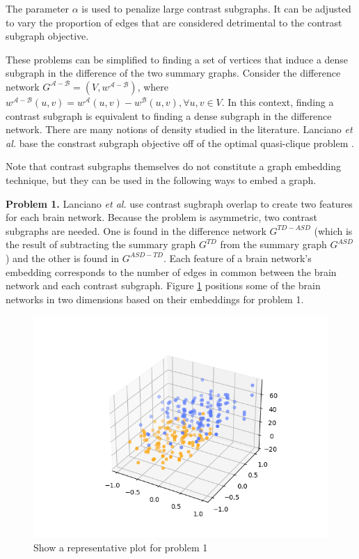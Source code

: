 \documentclass[sigconf]{acmart}
\begin{document}
The parameter $\alpha$ is used to penalize large contrast subgraphs.
It can be adjusted to vary the proportion of edges that are considered detrimental to the contrast subgraph objective.

These problems can be simplified to finding a set of vertices that induce a dense subgraph in the difference of the two summary graphs.
Consider the difference network  $G^{\mathcal{A} - \mathcal{B}} = (V, w^{\mathcal{A} - \mathcal{B}})$, where \\ $w^{\mathcal{A} - \mathcal{B}}(u,v) = w^{\mathcal{A}}(u,v) - w^{\mathcal{B}}(u,v), \forall u,v \in V$.
In this context, finding a contrast subgraph is equivalent to finding a dense subgraph in the difference network.
There are many notions of density studied in the literature.
Lanciano \emph{et al.} base the constrast subgraph objective off of the optimal quasi-clique problem \cite{tsourakakis2013}.

Note that contrast subgraphs themselves do not constitute a graph embedding technique, but they can be used in the following ways to embed a graph.

\textbf{Problem 1.}
Lanciano \emph{et al.} use contrast sugbraph overlap to create two features for each brain network.
Because the problem is asymmetric, two contrast subgraphs are needed.
One is found in the difference network $G^{TD - ASD}$ (which is the result of subtracting the summary graph $G^{TD}$ from the summary graph $G^{ASD}$) and the other is found in $G^{ASD - TD}$.
Each feature of a brain network's embedding corresponds to the number of edges in common between the brain network and each contrast subgraph.
Figure \ref{fig:prob1} positions some of the brain networks in two dimensions based on their embeddings for problem 1. 

\begin{figure}
    \centering
    \includegraphics[width=\columnwidth, keepaspectratio=true]{test.png}
    \caption{Show a representative plot for problem 1}
    \label{fig:prob1}
\end{figure}
\end{document}
